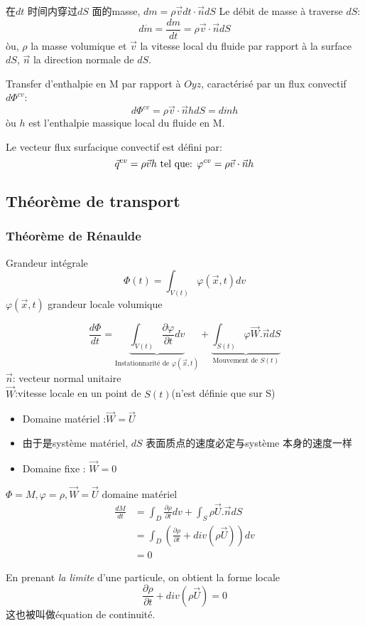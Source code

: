 \documentclass{article}
\begin{document}
在$dt$ 时间内穿过$dS$ 面的masse, $dm = \rho \vec{v} dt \cdot \vec{n} dS$
Le d\'ebit de masse \`a traverse $dS$:
$$d\dot{m} = \dfrac{dm}{dt} = \rho \vec{v} \cdot \vec{n} dS$$
\`ou, $\rho$ la masse volumique et $\vec{v}$ la vitesse local du fluide par rapport \`a la surface $dS$, $\vec{n}$ la direction normale de $dS$.

Transfer d'enthalpie en M par rapport \`a $Oyz$, caract\'eris\'e par un flux convectif $d\Phi^{cv}$:
$$ d \Phi^{cv} = \rho \vec{v} \cdot \vec{n} h dS = d\dot{m} h $$
\`ou $h$ est l'enthalpie massique local du fluide en M.

Le vecteur flux surfacique convectif est d\'efini par:
$$ \vec{q}^{cv} = \rho \vec{v} h \text{ tel que: } \varphi^{cv} = \rho \vec{v} \cdot \vec{n} h$$

\subsection{Th\'eor\`eme de transport} 
\subsubsection{Th\'eor\`eme de R\'enaulde}
Grandeur int\'egrale
$$ \Phi(t)=\int_{V(t)} \varphi(\vec{x},t)dv $$
$\varphi(\vec{x},t)$ grandeur locale volumique

$$
\frac{ d\Phi}{dt}=
\underbrace{\int_{V(t)}\frac{\partial \varphi}{\partial t}dv}_{\text{Instationnarit\'e de } \varphi(\vec{x},t)}
+
\underbrace{\int_{S(t)} \varphi \vec{W}.\vec{n}dS}_{\text{Mouvement de }S(t)}
$$
$\vec{n}$: vecteur normal unitaire\\
$\vec{W}$:vitesse locale en un point de $S(t)$(n'est définie que sur S)\\
\begin{itemize}
\item Domaine mat\'eriel :$\vec{W}=\vec{U}$
\item []由于是syst\`eme mat\'eriel, $dS$ 表面质点的速度必定与syst\`eme 本身的速度一样
\item Domaine fixe : $\vec{W}=0$
\end{itemize}

\begin{example}
 $\Phi = M,\varphi=\rho,\vec{ W}=\vec{ U}\text{ domaine mat\'eriel}$
\begin{equation}
	\begin{split}
\frac{ dM}{dt} & =\int_D \frac{\partial \rho}{\partial t}dv+ \int_S \rho \vec{ U}.\vec{ n}dS \\
& = \int_D (\frac{\partial \rho }{\partial t} + div(\rho \vec{ U}))dv \\
& =0	
	\end{split}
\end{equation}

En prenant \emph{la limite} d'une particule, on obtient la forme locale
$$
\frac{\partial \rho }{\partial t} + div(\rho \vec{ U})=0
$$
这也被叫做\'equation de continuit\'e.
\end{example}
\end{document}
